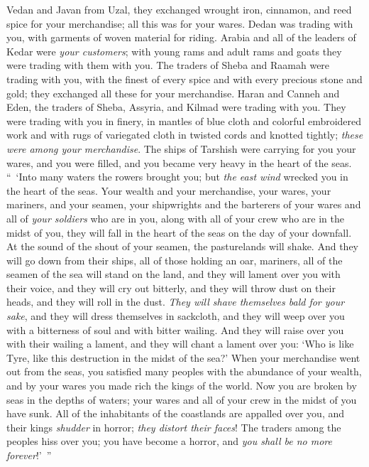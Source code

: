 \begin{biblechapter}
\verse Vedan and Javan from Uzal, they exchanged wrought iron, cinnamon, and reed spice for your merchandise; all this was for your wares.
\verse Dedan was trading with you, with garments of woven material for riding.
\verse Arabia and all of the leaders of Kedar were \textit{your customers}; with young rams and adult rams and goats they were trading with them with you.
\verse The traders of Sheba and Raamah were trading with you, with the finest of every spice and with every precious stone and gold; they exchanged all these for your merchandise.
\verse Haran and Canneh and Eden, the traders of Sheba, Assyria, and Kilmad were trading with you.
\verse They were trading with you in finery, in mantles of blue cloth and colorful embroidered work and with rugs of variegated cloth in twisted cords and knotted tightly; \textit{these were among your merchandise}.
\verse The ships of Tarshish were carrying for you your wares, and you were filled, and you became very heavy in the heart of the seas.
\verse “ ‘Into many waters 
the rowers brought you; 
but \textit{the east wind} wrecked you 
in the heart of the seas.
\verse Your wealth and your merchandise, your wares, 
your mariners, and your seamen, 
your shipwrights and the barterers of your wares 
and all of \textit{your soldiers} who are in you, 
along with all of your crew who are in the midst of you, 
they will fall in the heart of the seas on the day of your downfall.
\verse At the sound of the shout of your seamen, 
the pasturelands will shake.
\verse And they will go down from their ships, 
all of those holding an oar, 
mariners, all of the seamen of the sea 
will stand on the land,
\verse and they will lament over you with their voice, 
and they will cry out bitterly, 
and they will throw dust on their heads, 
and they will roll in the dust.
\verse \textit{They will shave themselves bald for your sake}, 
and they will dress themselves in sackcloth, 
and they will weep over you with a bitterness of soul 
and with bitter wailing.
\verse And they will raise over you with their wailing a lament, 
and they will chant a lament over you: 
‘Who is like Tyre, 
like this destruction in the midst of the sea?’
\verse When your merchandise went out from the seas, 
you satisfied many peoples with the abundance of your wealth, 
and by your wares 
you made rich the kings of the world.
\verse Now you are broken by seas 
in the depths of waters; 
your wares and all of your crew 
in the midst of you have sunk.
\verse All of the inhabitants of the coastlands 
are appalled over you, 
and their kings \textit{shudder} in horror; 
\textit{they distort their faces}!
\verse The traders among the peoples hiss over you; 
you have become a horror, 
and \textit{you shall be no more forever}!’ ”
\end{biblechapter}

